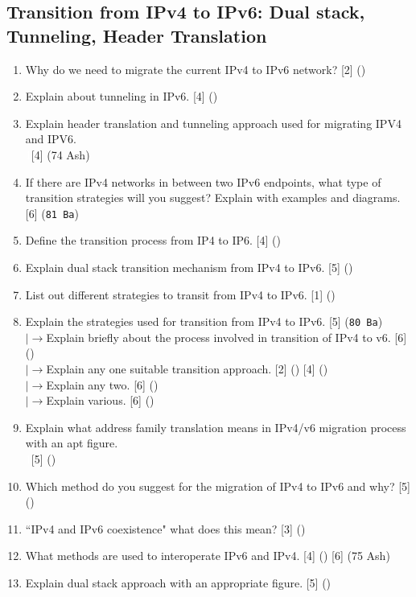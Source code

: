 \documentclass[12pt]{article}
\newcommand{\lb}{\\$\left|\rightarrow\right.$}
\newcommand{\enter}{\\\textcolor{white}{1}}
\begin{document}
	\subsection{Transition from IPv4 to IPv6: Dual stack, Tunneling, Header Translation}
		\begin{enumerate}[noitemsep, topsep=0pt]
			\item Why do we need to migrate the current IPv4 to IPv6 network? \hfill [2] ()

			\item Explain about tunneling in IPv6. \hfill [4] ()

			\item Explain header translation and tunneling approach used for migrating IPV4 and IPV6.
			\enter\hfill [4] (74 Ash)

			\item If there are IPv4 networks in between two IPv6 endpoints, what type of transition strategies will you suggest? Explain with examples and diagrams. \hfill [6] (\texttt{81 Ba})

			\item Define the transition process from IP4 to IP6. \hfill [4] ()

			\item Explain dual stack transition mechanism from IPv4 to IPv6. \hfill [5] ()

			\item List out different strategies to transit from IPv4 to IPv6. \hfill [1] ()

			\item Explain the strategies used for transition from IPv4 to IPv6. \hfill [5] (\texttt{80 Ba})
			\lb Explain briefly about the process involved in transition of IPv4 to v6. \hfill [6] ()
			\lb Explain any one suitable transition approach. \hfill [2] () [4] ()
			\lb Explain any two. \hfill [6] ()
			\lb Explain various. \hfill [6] ()

			\item Explain what address family translation means in IPv4/v6 migration process with an apt figure.
			\enter\hfill [5] ()

			\item Which method do you suggest for the migration of IPv4 to IPv6 and why? \hfill [5] ()

			\item ``IPv4 and IPv6 coexistence" what does this mean? \hfill [3] () 

			\item What methods are used to interoperate IPv6 and IPv4. \hfill [4] () [6] (75 Ash)

			\item Explain dual stack approach with an appropriate figure. \hfill [5] ()
		\end{enumerate}
\end{document}
